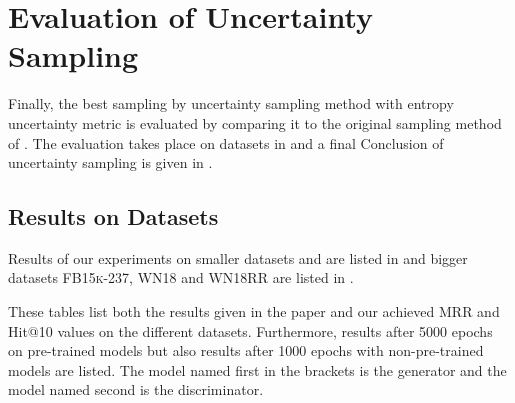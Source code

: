 \section{Evaluation of Uncertainty Sampling}
\label{ch:evaluation:sec:evaluation_uncertainty}

Finally, the best sampling by uncertainty sampling method \ussoftmax with entropy uncertainty metric is evaluated by comparing it to the original sampling method \origsampling of \kbgan.
The evaluation takes place on datasets in  and a final Conclusion of uncertainty sampling is given in .
%
\subsection{Results on Datasets} \label{subsec:results_uncertainty}




%
Results of our experiments on smaller datasets \umls and \kinship  are listed in  and bigger datasets \textsc{FB15k-237},  \textsc{WN18} and \textsc{WN18RR} are listed in .


These tables list both the results given in the \kbgan paper \cite{cai2017kbgan} and our achieved MRR and Hit@10 values on the different datasets.
Furthermore, results after 5000 epochs on pre-trained models but also results after 1000 epochs with non-pre-trained models are listed.
The model named first in the brackets is the generator and the model named second is the discriminator.



